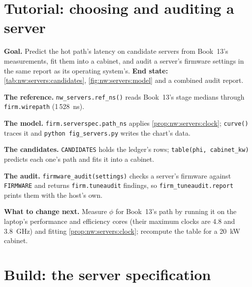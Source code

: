 \section{Tutorial: choosing and auditing a server}\label{tut:nw:servers:tut}

\begin{tutorial}
\textbf{Goal.} Predict the hot path's latency on candidate servers from Book~13's measurements, fit them into a cabinet, and audit a
server's firmware settings in the same report as its operating system's. \textbf{End state:} \cref{tab:nw:servers:candidates},
\cref{fig:nw:servers:model} and a combined audit report.
\begin{tutsteps}
\item \textbf{The reference.} \texttt{nw\_servers.ref\_ns()} reads Book~13's stage medians through \texttt{firm.wirepath} (1\,528~ns).
\item \textbf{The model.} \texttt{firm.serverspec.path\_ns} applies \cref{prop:nw:servers:clock}; \texttt{curve()} traces it and
  \texttt{python fig\_servers.py} writes the chart's data.
\item \textbf{The candidates.} \texttt{CANDIDATES} holds the ledger's rows; \texttt{table(phi, cabinet\_kw)} predicts each one's path and fits
  it into a cabinet.
\item \textbf{The audit.} \texttt{firmware\_audit(settings)} checks a server's firmware against \texttt{FIRMWARE} and returns
  \texttt{firm.tuneaudit} findings, so \texttt{firm\_tuneaudit.report} prints them with the host's own.
\end{tutsteps}
\textbf{What to change next.} Measure $\phi$ for Book~13's path by running it on the laptop's performance and efficiency cores (their maximum
clocks are 4.8 and 3.8~GHz) and fitting \cref{prop:nw:servers:clock}; recompute the table for a \qty{20}{\kilo\watt} cabinet.
\end{tutorial}

\label{lst:nw:servers:model}

\section{Build: the server specification}\label{bld:nw:servers:serverspec}


